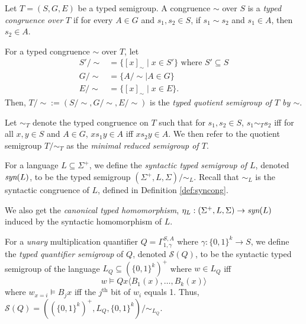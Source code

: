 \documentclass[a4paper,UKenglish,cleveref, autoref, thm-restate, anonymous]{lipics-v2021}
\begin{document}
\begin{definition}\label{def:typedcongmin}
    Let $T = (S, G, E)$ be a typed semigroup. A congruence $\sim$ over $S$ is a \emph{typed congruence over $T$} if for every $A \in G$ and $s_1,s_2\in S$, if $s_1 \sim s_2$ and $s_1 \in A$, then $s_2 \in A$.

    For a typed congruence $\sim$ over $T$, let
    \begin{align*}
        S'/{\sim} &= \{[x]_\sim \mid x \in S'\} \text{ where $S' \subseteq S$}\\
        G/{\sim} &= \{A/{\sim} \mid A \in G\}\\
        E/{\sim} &= \{[x]_\sim \mid x \in E\}.
    \end{align*}
    \noindent Then, $T/{\sim} := (S/{\sim}, G/{\sim}, E/{\sim})$ is the \emph{typed quotient semigroup of $T$ by $\sim$}.

    Let $\sim_T$ denote the typed congruence on $T$ such that for $s_1,s_2 \in S$, $s_1 \sim_T s_2$ iff for all $x,y \in S$ and $A \in G$, $xs_1y \in A$ iff $xs_2y \in A$. We then refer to the quotient semigroup $T/{\sim_T}$ as the \emph{minimal reduced semigroup of $T$}.
\end{definition}

\begin{definition}
    For a language $L \subseteq \Sigma^+$, we define the \emph{syntactic typed semigroup of $L$}, denoted $\emph{syn}(L)$, to be the typed semigroup $(\Sigma^+, L, \Sigma)/{\sim_L}$. Recall that ${\sim_L}$ is the syntactic congruence of $L$, defined in Definition \ref{def:syncong}.

    We also get the \emph{canonical typed homomorphism}, $\eta_L : (\Sigma^+, L, \Sigma) \rightarrow \emph{syn}(L)$ induced by the syntactic homomorphism of $L$.
\end{definition} 


\begin{definition}\label{def:origtypedquantsemi}
    For a \emph{unary} multiplication quantifier $Q = \Gamma^{S,A}_{1,\gamma}$ where $\gamma : \{0,1\}^k \rightarrow S$, we define the \emph{typed quantifier semigroup} of $Q$, denoted $\mathcal{S}(Q)$, to be the syntactic typed semigroup of the language $L_Q \subseteq (\{0,1\}^k)^+$ where $w \in L_Q$ iff \[
        w \models Q x \langle B_1(x), \dots, B_k(x) \rangle
    \] where $w_{x=i} \models B_jx$ iff the $j^{\text{th}}$ bit of $w_i$ equals 1. Thus, $\mathcal{S}(Q) = ((\{0,1\}^k)^+, L_Q, \{0,1\}^k) / {\sim_{L_Q}}$.
\end{definition}
\end{document}
